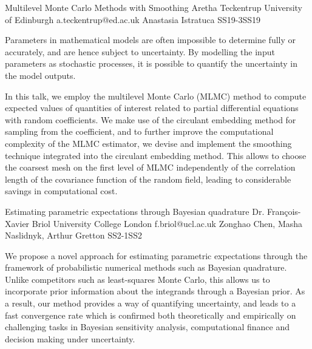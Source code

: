 \begin{talk}
  {Multilevel Monte Carlo Methods with Smoothing}%
  {Aretha Teckentrup}%
  {University of Edinburgh}%
  {a.teckentrup@ed.ac.uk}%
  {Anastasia Istratuca}%
{}{}{SS19-3}{SS19}


				
				

Parameters in mathematical models are often impossible to determine fully or accurately, and are hence subject to uncertainty. By modelling the input parameters as stochastic processes, it is possible to quantify the uncertainty in the model outputs. 

In this talk, we employ the multilevel Monte Carlo (MLMC) method to compute expected values of quantities of interest related to partial differential equations with random coefficients. We make use of the circulant embedding method for sampling from the coefficient, and to further improve the computational complexity of the MLMC estimator, we devise and implement the smoothing technique integrated into the circulant embedding method. This allows to choose the coarsest mesh on the first level of MLMC independently of the correlation length of the covariance function of the random field, leading to considerable savings in computational cost.
\end{talk}

\begin{talk}
  {Estimating parametric expectations through Bayesian quadrature}%
  {Dr. Fran\c{c}ois-Xavier Briol}%
  {University College London}%
  {f.briol@ucl.ac.uk}%
  {Zonghao Chen, Masha Naslidnyk, Arthur Gretton}%
{}{}{SS2-1}{SS2}

			
We propose a novel approach for estimating parametric expectations through the framework of probabilistic numerical methods such as Bayesian quadrature. Unlike competitors such as least-squares Monte Carlo, this allows us to incorporate prior information about the integrands through a Bayesian prior. As a result, our method provides a way of quantifying uncertainty, and leads to a fast convergence rate which is confirmed both theoretically and empirically on challenging tasks in Bayesian sensitivity analysis, computational finance and decision making under  uncertainty.
\end{talk}

